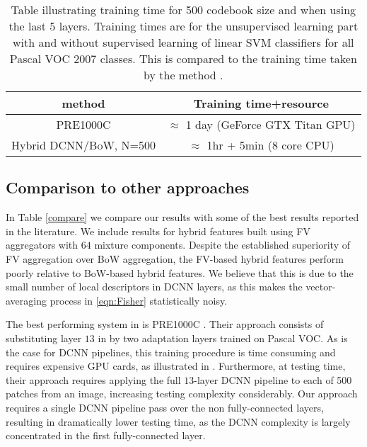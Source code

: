 \documentclass{article}
\begin{document}
\begin{table}[!ht]
\centering
\begin{tabular}{|c|c|}
\hline
method& Training time+resource \\
\hline
PRE1000C \cite{Oquaba}& $\approx$ 1 day (GeForce GTX Titan GPU)\\
Hybrid DCNN/BoW, N=500& $\approx$ 1hr + 5min (8 core CPU)\\
\hline
\end{tabular}
\caption{Table illustrating training time for 500 codebook size and when using the last 5 layers. Training times are for the unsupervised learning part with and without supervised learning of linear SVM classifiers for all Pascal VOC 2007 classes. This is compared to the training time taken by the method \cite{Oquaba}.}
\label{complexity}
\end{table}


\subsection{Comparison to other approaches}
In Table \ref{compare} we compare our results with some of the best results reported in the literature. We include results for hybrid features built using FV aggregators with $64$ mixture components. Despite the established superiority of FV aggregation over BoW aggregation, the FV-based hybrid features perform poorly relative to BoW-based hybrid features. We believe that this is due to the small number of local descriptors in DCNN layers, as this makes the vector-averaging process in \eqref{eqn:Fisher} statistically noisy.

The best performing system in  is PRE1000C \cite{Oquaba}. Their approach consists of substituting layer $13$ in  by two adaptation layers trained on Pascal VOC. As is the case for DCNN pipelines, this training procedure is time consuming and requires expensive GPU cards, as illustrated in  . Furthermore, at testing time, their approach requires applying the full $13$-layer DCNN pipeline to each of 500 patches from an image, increasing testing complexity considerably. Our approach requires a single DCNN pipeline pass over the non fully-connected layers, resulting in dramatically lower testing time, as the DCNN complexity is largely concentrated in the first fully-connected layer. 
\end{document}
